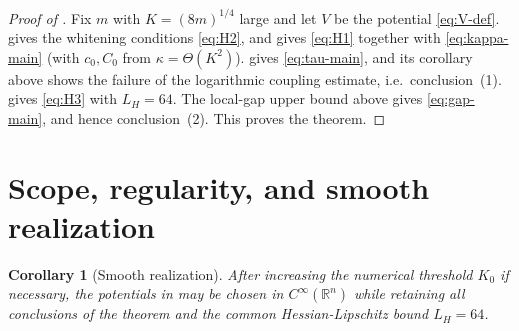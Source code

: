 \documentclass[11pt]{article}
\theoremstyle{plain}
\newtheorem{corollary}[theorem]{Corollary}
\theoremstyle{definition}
\theoremstyle{remark}
\newcommand{\R}{\mathbb{R}}
\newcommand{\1}{\mathbf{1}}
\begin{document}
\begin{proof}[Proof of ]
Fix $m$ with $K=(8m)^{1/4}$ large and let $V$ be the potential
\eqref{eq:V-def}.  gives the whitening conditions
\eqref{eq:H2}, and  gives \eqref{eq:H1} together with
\eqref{eq:kappa-main} (with $c_0,C_0$ from $\kappa=\Theta(K^2)$).
 gives \eqref{eq:tau-main}, and its corollary above shows
the failure of the logarithmic coupling estimate, i.e.\ conclusion~(1).
 gives \eqref{eq:H3} with $L_H=64$. The local-gap upper bound
above gives \eqref{eq:gap-main}, and hence conclusion~(2). This proves the
theorem.
\end{proof}

\section{Scope, regularity, and smooth realization}

\begin{corollary}[Smooth realization]
\label{cor:smooth-ridge}
After increasing the numerical threshold $K_0$ if necessary, the potentials
in  may be chosen in $C^\infty(\R^n)$ while retaining all
conclusions of the theorem and the common Hessian-Lipschitz bound $L_H=64$.
\end{corollary}
\end{document}
